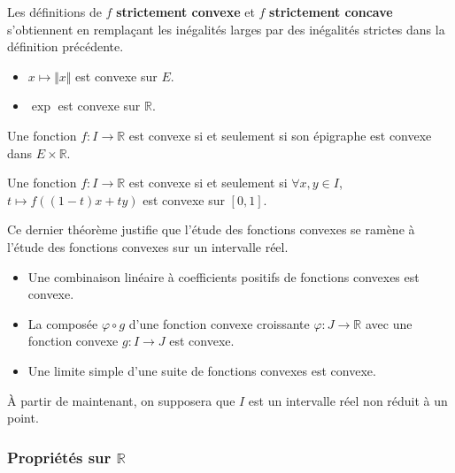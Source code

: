   \begin{remark}
    Les définitions de $f$ \textbf{strictement convexe} et $f$ \textbf{strictement concave} s'obtiennent en remplaçant les inégalités larges par des inégalités strictes dans la définition précédente.
  \end{remark}

  \begin{example}
    \begin{itemize}
      \item $x \mapsto \Vert x \Vert$ est convexe sur $E$.
      \item $\exp$ est convexe sur $\mathbb{R}$.
    \end{itemize}
  \end{example}

  \begin{proposition}
    Une fonction $f : I \rightarrow \mathbb{R}$ est convexe si et seulement si son épigraphe est convexe dans $E \times \mathbb{R}$.
  \end{proposition}

  \begin{theorem}
    Une fonction $f : I \rightarrow \mathbb{R}$ est convexe si et seulement si $\forall x, y \in I$, $t \mapsto f((1-t)x + ty)$ est convexe sur $[0,1]$.
  \end{theorem}

  Ce dernier théorème justifie que l'étude des fonctions convexes se ramène à l'étude des fonctions convexes sur un intervalle réel.

  \begin{proposition}
    \begin{itemize}
      \item Une combinaison linéaire à coefficients positifs de fonctions convexes est convexe.
      \item La composée $\varphi \circ g$ d'une fonction convexe croissante $\varphi : J \rightarrow \mathbb{R}$ avec une fonction convexe $g : I \rightarrow J$ est convexe.
      \item Une limite simple d'une suite de fonctions convexes est convexe.
    \end{itemize}
  \end{proposition}

  À partir de maintenant, on supposera que $I$ est un intervalle réel non réduit à un point.

  \subsubsection{Propriétés sur \texorpdfstring{$\mathbb{R}$}{R}}

